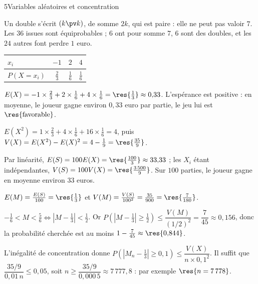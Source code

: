 

\begin{corrigeBac}{5}{Variables aléatoires et concentration}
\begin{questions}
  \item Un double s'écrit $(k\pv k)$, de somme $2k$, qui est paire : elle ne peut pas valoir $7$. Les $36$ issues sont équiprobables ;
    $6$ ont pour somme $7$, $6$ sont des doubles, et les $24$ autres font perdre $1$ euro.
\begin{center}
{\renewcommand{\arraystretch}{1.35}%
\begin{tabular}{@{}lccc@{}}
\toprule
$x_i$ & $-1$ & $2$ & $4$ \\
\midrule
$P(X=x_i)$ & $\frac23$ & $\frac16$ & $\frac16$ \\
\bottomrule
\end{tabular}}
\end{center}
    \pts{1 pt}
  \item $E(X)=-1\times\frac23+2\times\frac16+4\times\frac16=\res{\tfrac13}\approx0{,}33$. L'espérance est positive : en moyenne, le
    joueur gagne environ $0{,}33$ euro par partie, le jeu lui est $\res{\text{favorable}}$. 
  \item $E(X^{2})=1\times\frac23+4\times\frac16+16\times\frac16=4$, puis $V(X)=E(X^{2})-E(X)^{2}=4-\frac19=\res{\tfrac{35}{9}}$. 
\end{questions}
\begin{questions}[resume]
  \item Par linéarité, $E(S)=100E(X)=\res{\tfrac{100}{3}}\approx33{,}33$ ; les $X_i$ étant indépendantes,
    $V(S)=100V(X)=\res{\tfrac{3\,500}{9}}$. Sur $100$ parties, le joueur gagne en moyenne environ $33$ euros. 
  \item $E(M)=\frac{E(S)}{100}=\res{\tfrac13}$ et $V(M)=\frac{V(S)}{100^{2}}=\frac{35}{900}=\res{\tfrac{7}{180}}$. 
  \item $-\frac16<M<\frac56\iff\left|M-\frac13\right|<\frac12$. Or
    $P\left(\left|M-\frac13\right|\geq\frac12\right)\leq\dfrac{V(M)}{(1/2)^{2}}=\dfrac{7}{45}\approx0{,}156$, donc la probabilité cherchée
    est au moins $1-\frac7{45}\approx\res{0{,}844}$. 
  \item L'inégalité de concentration donne $P\left(\left|M_n-\frac13\right|\geq0{,}1\right)\leq\dfrac{V(X)}{n\times0{,}1^{2}}$. Il suffit
    que $\dfrac{35/9}{0{,}01\,n}\leq0{,}05$, soit $n\geq\dfrac{35/9}{0{,}000\,5}\approx7\,777{,}8$ : par exemple $\res{n=7\,778}$. 
\end{questions}
\end{corrigeBac}

